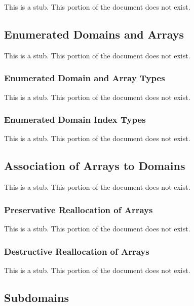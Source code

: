 This is a stub.  This portion of the document does not exist.

\subsection{Enumerated Domains and Arrays}
\label{Enumerated_Domains_and_Arrays}

This is a stub.  This portion of the document does not exist.

\subsubsection{Enumerated Domain and Array Types}
\label{Enumerated_Domain_and_Array_Types}

This is a stub.  This portion of the document does not exist.

\subsubsection{Enumerated Domain Index Types}
\label{Enumerated_Domain_Index_Types}

This is a stub.  This portion of the document does not exist.

\subsection{Association of Arrays to Domains}
\label{Association_of_Arrays_to_Domains}

This is a stub.  This portion of the document does not exist.

\subsubsection{Preservative Reallocation of Arrays}
\label{Preservative_Reallocation_of_Arrays}

This is a stub.  This portion of the document does not exist.

\subsubsection{Destructive Reallocation of Arrays}
\label{Destructive_Reallocation_of_Arrays}

This is a stub.  This portion of the document does not exist.

\subsection{Subdomains}
\label{Subdomains}

